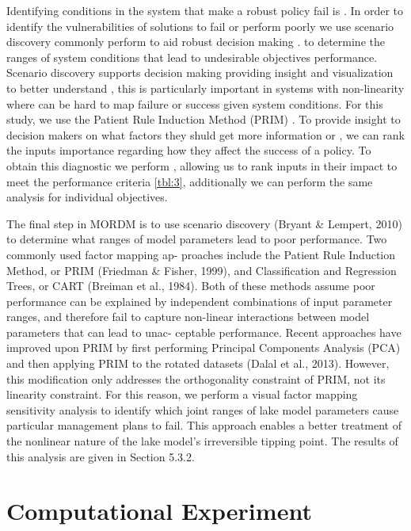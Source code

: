 \documentclass[a4paper,fleqn]{cas-sc}
\begin{document}
Identifying conditions in the system that make a robust policy fail is . In order to identify the vulnerabilities of solutions to fail or perform poorly we use scenario discovery commonly perform to aid robust decision making \citep{kasprzyk_many_2013}. to determine the ranges of system conditions that lead to undesirable objectives performance. Scenario discovery supports decision making providing insight and visualization to better understand , this is particularly important in systems with non-linearity where can be hard to map failure or success given system conditions. For this study, we use the Patient Rule Induction Method (PRIM) \citep{fried} . To provide insight to decision makers on what factors they shuld get more information or , we can rank the inputs importance regarding how they affect the success of a policy. To obtain this diagnostic we perform , allowing us to rank inputs in their impact to meet the performance criteria \ref{tbl:3}, additionally we can perform the same analysis for individual objectives. 

\citep{kasprzyk_many_2013,quinn_direct_2017}

The ﬁnal step in MORDM is to use scenario discovery (Bryant &
Lempert, 2010) to determine what ranges of model parameters lead
to poor performance. Two commonly used factor mapping ap-
proaches include the Patient Rule Induction Method, or PRIM
(Friedman & Fisher, 1999), and Classiﬁcation and Regression Trees,
or CART (Breiman et al., 1984). Both of these methods assume poor
performance can be explained by independent combinations of
input parameter ranges, and therefore fail to capture non-linear
interactions between model parameters that can lead to unac-
ceptable performance. Recent approaches have improved upon
PRIM by ﬁrst performing Principal Components Analysis (PCA) and
then applying PRIM to the rotated datasets (Dalal et al., 2013).
However, this modiﬁcation only addresses the orthogonality
constraint of PRIM, not its linearity constraint. For this reason, we
perform a visual factor mapping sensitivity analysis to identify
which joint ranges of lake model parameters cause particular
management plans to fail. This approach enables a better treatment
of the nonlinear nature of the lake model's irreversible tipping
point. The results of this analysis are given in Section 5.3.2.


\section{Computational Experiment}
\end{document}
